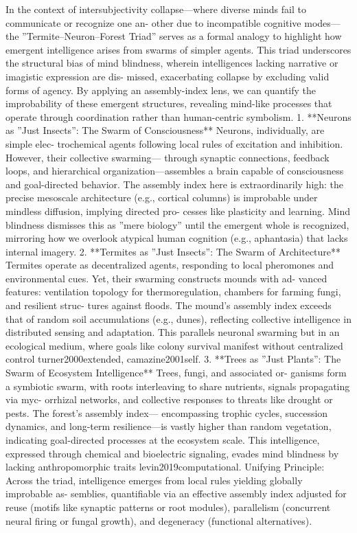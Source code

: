 \documentclass{article}
\begin{document}
In the context of intersubjectivity collapse—where diverse minds fail to communicate or recognize one an-
other due to incompatible cognitive modes—the ”Termite–Neuron–Forest Triad” serves as a formal analogy
to highlight how emergent intelligence arises from swarms of simpler agents. This triad underscores the
structural bias of mind blindness, wherein intelligences lacking narrative or imagistic expression are dis-
missed, exacerbating collapse by excluding valid forms of agency.
By applying an assembly-index lens,
we can quantify the improbability of these emergent structures, revealing mind-like processes that operate
through coordination rather than human-centric symbolism.
1. **Neurons as ”Just Insects”: The Swarm of Consciousness** Neurons, individually, are simple elec-
trochemical agents following local rules of excitation and inhibition. However, their collective swarming—
through synaptic connections, feedback loops, and hierarchical organization—assembles a brain capable
of consciousness and goal-directed behavior. The assembly index here is extraordinarily high: the precise
mesoscale architecture (e.g., cortical columns) is improbable under mindless diffusion, implying directed pro-
cesses like plasticity and learning. Mind blindness dismisses this as ”mere biology” until the emergent whole
is recognized, mirroring how we overlook atypical human cognition (e.g., aphantasia) that lacks internal
imagery.
2. **Termites as ”Just Insects”: The Swarm of Architecture** Termites operate as decentralized agents,
responding to local pheromones and environmental cues. Yet, their swarming constructs mounds with ad-
vanced features: ventilation topology for thermoregulation, chambers for farming fungi, and resilient struc-
tures against floods. The mound’s assembly index exceeds that of random soil accumulations (e.g., dunes),
reflecting collective intelligence in distributed sensing and adaptation. This parallels neuronal swarming but
in an ecological medium, where goals like colony survival manifest without centralized control {turner2000extended, camazine2001self}.
3. **Trees as ”Just Plants”: The Swarm of Ecosystem Intelligence** Trees, fungi, and associated or-
ganisms form a symbiotic swarm, with roots interleaving to share nutrients, signals propagating via myc-
orrhizal networks, and collective responses to threats like drought or pests. The forest’s assembly index—
encompassing trophic cycles, succession dynamics, and long-term resilience—is vastly higher than random
vegetation, indicating goal-directed processes at the ecosystem scale. This intelligence, expressed through
chemical and bioelectric signaling, evades mind blindness by lacking anthropomorphic traits {levin2019computational}.
Unifying Principle: Across the triad, intelligence emerges from local rules yielding globally improbable as-
semblies, quantifiable via an effective assembly index adjusted for reuse (motifs like synaptic patterns or root
modules), parallelism (concurrent neural firing or fungal growth), and degeneracy (functional alternatives).
\end{document}
